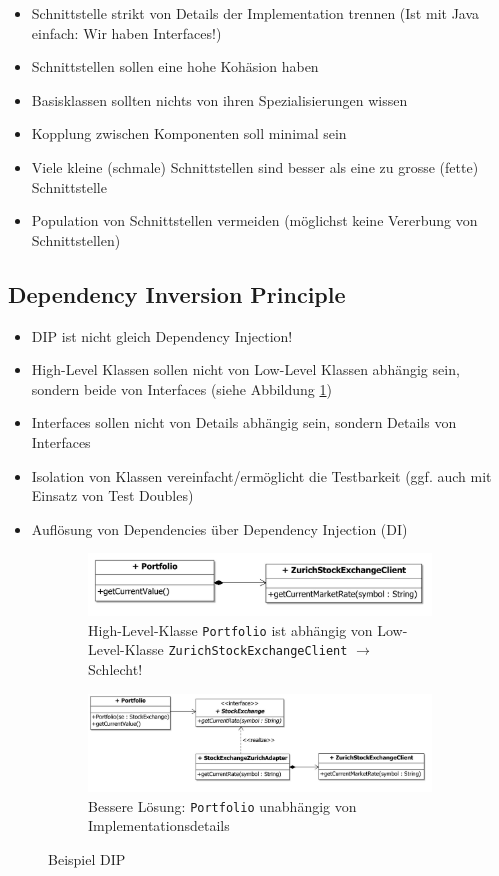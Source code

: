 \begin{itemize}
	\item Schnittstelle strikt von Details der Implementation trennen (Ist mit Java einfach: Wir haben Interfaces!)
	\item Schnittstellen sollen eine hohe Kohäsion haben
	\item Basisklassen sollten nichts von ihren Spezialisierungen wissen
	\item Kopplung zwischen Komponenten soll minimal sein
	\item Viele kleine (schmale) Schnittstellen sind besser als eine zu grosse (fette) Schnittstelle
	\item Population von Schnittstellen vermeiden (möglichst keine Vererbung von Schnittstellen)
\end{itemize}

\subsection{Dependency Inversion Principle}

\begin{itemize}
	\item DIP ist nicht gleich Dependency Injection!
	\item High-Level Klassen sollen nicht von Low-Level Klassen abhängig sein, sondern beide von Interfaces (siehe Abbildung \ref{fig:dip-beispiel})
	\item Interfaces sollen nicht von Details abhängig sein, sondern Details von Interfaces
	\item Isolation von Klassen vereinfacht/ermöglicht die Testbarkeit (ggf. auch mit Einsatz von Test Doubles)
	\item Auflösung von Dependencies über Dependency Injection (DI)
\end{itemize}

\begin{figure}[h!]
	\centering
	\begin{subfigure}[b]{0.8\textwidth}
		\includegraphics[width=\textwidth]{fig/dip-schlecht}
		\caption{High-Level-Klasse \texttt{Portfolio} ist abhängig von Low-Level-Klasse \texttt{ZurichStockExchangeClient} $\rightarrow$ Schlecht!}
	\end{subfigure}
	\begin{subfigure}[b]{\textwidth}
		\includegraphics[width=\textwidth]{fig/dip-besser}
		\caption{Bessere Lösung: \texttt{Portfolio} unabhängig von Implementationsdetails}
	\end{subfigure}
	\caption{Beispiel DIP}\label{fig:dip-beispiel}
\end{figure}
